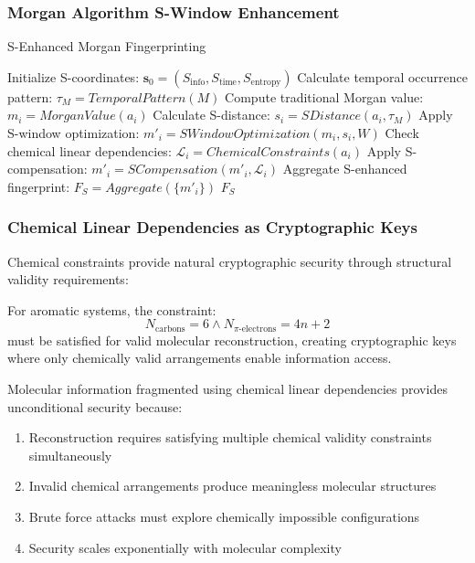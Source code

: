 \documentclass[11pt,a4paper]{article}
\begin{document}
\subsubsection{Morgan Algorithm S-Window Enhancement}

\begin{algorithm}
\caption{S-Enhanced Morgan Fingerprinting}
\begin{algorithmic}
    \State Initialize S-coordinates: $\mathbf{s}_0 = (S_{\text{info}}, S_{\text{time}}, S_{\text{entropy}})$
    \State Calculate temporal occurrence pattern: $\tau_M = TemporalPattern(M)$
        \State Compute traditional Morgan value: $m_i = MorganValue(a_i)$
        \State Calculate S-distance: $s_i = SDistance(a_i, \tau_M)$
        \State Apply S-window optimization: $m'_i = SWindowOptimization(m_i, s_i, W)$
        \State Check chemical linear dependencies: $\mathcal{L}_i = ChemicalConstraints(a_i)$
            \State Apply S-compensation: $m'_i = SCompensation(m'_i, \mathcal{L}_i)$
        \EndIf
    \EndFor
    \State Aggregate S-enhanced fingerprint: $F_S = Aggregate(\{m'_i\})$
    \State \Return $F_S$
\EndProcedure
\end{algorithmic}
\end{algorithm}

\subsubsection{Chemical Linear Dependencies as Cryptographic Keys}

Chemical constraints provide natural cryptographic security through structural validity requirements:

\begin{definition}
For aromatic systems, the constraint:
\begin{equation}
N_{\text{carbons}} = 6 \land N_{\pi\text{-electrons}} = 4n+2
\end{equation}
must be satisfied for valid molecular reconstruction, creating cryptographic keys where only chemically valid arrangements enable information access.
\end{definition}

\begin{theorem}
Molecular information fragmented using chemical linear dependencies provides unconditional security because:
\begin{enumerate}
\item Reconstruction requires satisfying multiple chemical validity constraints simultaneously
\item Invalid chemical arrangements produce meaningless molecular structures
\item Brute force attacks must explore chemically impossible configurations
\item Security scales exponentially with molecular complexity
\end{enumerate}
\end{theorem}
\end{document}

